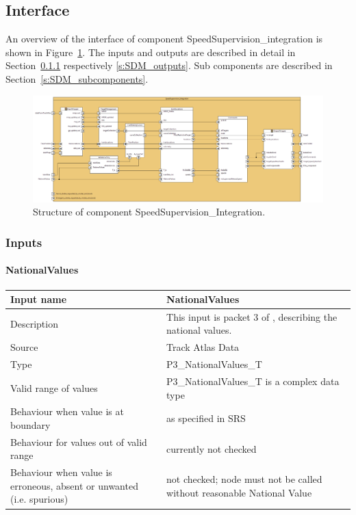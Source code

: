 \subsection{Interface}

An overview of the interface of component SpeedSupervision\_integration is shown in Figure~\ref{f:ssv}. The inputs and outputs are described in detail in Section~\ref{s:SDM_inputs} respectively \ref{s:SDM_outputs}. Sub components are described in Section~\ref{s:SDM_subcomponents}.

\begin{figure}
\centering
\includegraphics[width=0.95\textheight, angle=90]{../images/speedsupervision.png}
\caption{Structure of component SpeedSupervision\_Integration.}\label{f:ssv}
\end{figure}



\subsubsection{Inputs}\label{s:SDM_inputs}

\paragraph{NationalValues}

\begin{longtable}{p{}p{}}
\toprule
Input name				& NationalValues \\
\midrule
Description				& This input is packet 3 of \cite[Chapt.~8]{subset-026}, describing the national values.  \\
\midrule
Source					& Track Atlas Data \\ 
\midrule
Type					& P3\_NationalValues\_T \\
\midrule
Valid range of values	& P3\_NationalValues\_T is a complex data type \\
\midrule
Behaviour when value is at boundary	& as specified in SRS \\
\midrule
Behaviour for values out of valid range	& currently not checked \\
\midrule
Behaviour when value is erroneous, absent or unwanted (i.e. spurious) & not checked; node must not be called without reasonable National Value \\
\bottomrule
\end{longtable}


